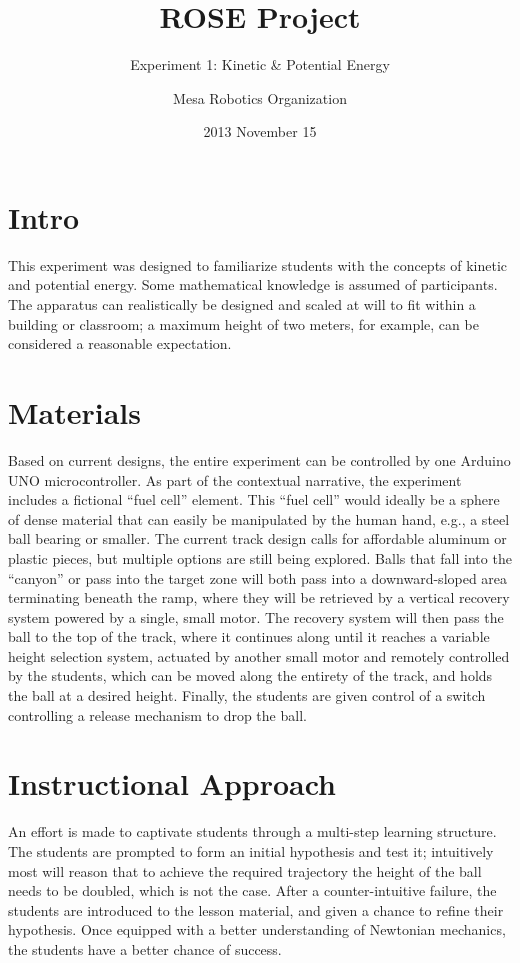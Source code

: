 \documentclass[10pt]{scrartcl}
\begin{document}
\title{ROSE Project}
\subtitle{Experiment 1: Kinetic & Potential Energy}
\author{Mesa Robotics Organization}
\date{2013 November 15}


\section{Intro}

This experiment was designed to familiarize students with the concepts of kinetic and potential energy. Some mathematical knowledge is assumed of participants. The apparatus can realistically be designed and scaled at will to fit within a building or classroom; a maximum height of two meters, for example, can be considered a reasonable expectation. 

\section{Materials}
Based on current designs, the entire experiment can be controlled by one Arduino UNO microcontroller. As part of the contextual narrative, the experiment includes a fictional “fuel cell” element.  This “fuel cell” would ideally be a sphere of dense material that can easily be manipulated by the human hand, e.g., a steel ball bearing or smaller. The current track design calls for affordable aluminum or plastic pieces, but multiple options are still being explored. Balls that fall into the “canyon” or pass into the target zone will both pass into a downward-sloped area terminating beneath the ramp, where they will be retrieved by a vertical recovery system powered by a single, small motor. The recovery system will then pass the ball to the top of the track, where it continues along until it reaches a variable height selection system, actuated by another small motor and remotely controlled by the students, which can be moved along the entirety of the track, and holds the ball at a desired height.  Finally, the students are given control of a switch controlling a release mechanism to drop the ball. 

\section{Instructional Approach}
An effort is made to captivate students through a multi-step learning structure. The students are prompted to form an initial hypothesis and test it; intuitively most will reason that to achieve the required trajectory the height of the ball needs to be doubled, which is not the case. After a counter-intuitive failure, the students are introduced to the lesson material, and given a chance to refine their hypothesis. Once equipped with a better understanding of Newtonian mechanics, the students have a better chance of success.
\end{document}
